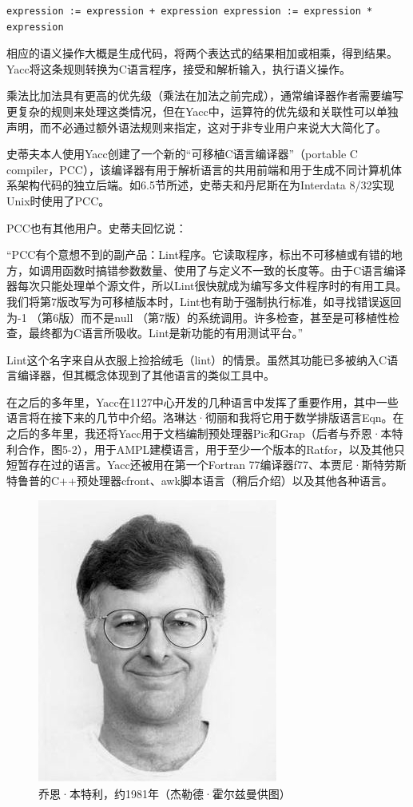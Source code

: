 \documentclass[a4paper,12pt,UTF8,twoside]{ctexbook}
\begin{document}
\begin{lstlisting}
expression := expression + expression expression := expression * expression
\end{lstlisting}

相应的语义操作大概是生成代码，将两个表达式的结果相加或相乘，得到结果。Yacc将这条规则转换为C语言程序，接受和解析输入，执行语义操作。

乘法比加法具有更高的优先级（乘法在加法之前完成），通常编译器作者需要编写更复杂的规则来处理这类情况，但在Yacc中，运算符的优先级和关联性可以单独声明，而不必通过额外语法规则来指定，这对于非专业用户来说大大简化了。

史蒂夫本人使用Yacc创建了一个新的“可移植C语言编译器”（portable C compiler，PCC），该编译器有用于解析语言的共用前端和用于生成不同计算机体系架构代码的独立后端。如6.5节所述，史蒂夫和丹尼斯在为Interdata 8/32实现Unix时使用了PCC。

PCC也有其他用户。史蒂夫回忆说：

“PCC有个意想不到的副产品：Lint程序。它读取程序，标出不可移植或有错的地方，如调用函数时搞错参数数量、使用了与定义不一致的长度等。由于C语言编译器每次只能处理单个源文件，所以Lint很快就成为编写多文件程序时的有用工具。我们将第7版改写为可移植版本时，Lint也有助于强制执行标准，如寻找错误返回为-1 （第6版）而不是null （第7版）的系统调用。许多检查，甚至是可移植性检查，最终都为C语言所吸收。Lint是新功能的有用测试平台。”

Lint这个名字来自从衣服上捡拾绒毛（lint）的情景。虽然其功能已多被纳入C语言编译器，但其概念体现到了其他语言的类似工具中。

在之后的多年里，Yacc在1127中心开发的几种语言中发挥了重要作用，其中一些语言将在接下来的几节中介绍。洛琳达·彻丽和我将它用于数学排版语言Eqn。在之后的多年里，我还将Yacc用于文档编制预处理器Pic和Grap（后者与乔恩·本特利合作，图5-2），用于AMPL建模语言，用于至少一个版本的Ratfor，以及其他只短暂存在过的语言。Yacc还被用在第一个Fortran 77编译器f77、本贾尼·斯特劳斯特鲁普的C++预处理器cfront、awk脚本语言（稍后介绍）以及其他各种语言。

\begin{figure}[htbp]
	\centering
	\includegraphics[width=0.7\linewidth]{41}
	\caption{乔恩·本特利，约1981年（杰勒德·霍尔兹曼供图）}
	\label{fig:1}
\end{figure}
\end{document}
